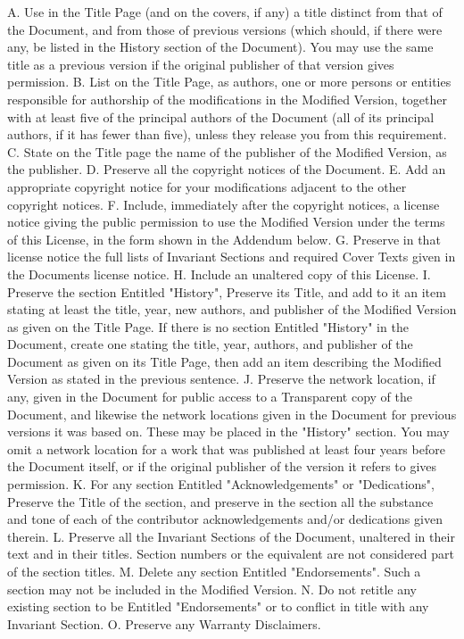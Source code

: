 \documentclass[
  english,
  11pt,
  a4paper,
]{article}
\begin{document}
A. Use in the Title Page (and on the covers, if any) a title distinct
from that of the Document, and from those of previous versions (which
should, if there were any, be listed in the History section of the
Document). You may use the same title as a previous version if the
original publisher of that version gives permission. B. List on the
Title Page, as authors, one or more persons or entities responsible for
authorship of the modifications in the Modified Version, together with
at least five of the principal authors of the Document (all of its
principal authors, if it has fewer than five), unless they release you
from this requirement. C. State on the Title page the name of the
publisher of the Modified Version, as the publisher. D. Preserve all the
copyright notices of the Document. E. Add an appropriate copyright
notice for your modifications adjacent to the other copyright notices.
F. Include, immediately after the copyright notices, a license notice
giving the public permission to use the Modified Version under the terms
of this License, in the form shown in the Addendum below. G. Preserve in
that license notice the full lists of Invariant Sections and required
Cover Texts given in the Document\textquotesingle s license notice. H.
Include an unaltered copy of this License. I. Preserve the section
Entitled "History", Preserve its Title, and add to it an item stating at
least the title, year, new authors, and publisher of the Modified
Version as given on the Title Page. If there is no section Entitled
"History" in the Document, create one stating the title, year, authors,
and publisher of the Document as given on its Title Page, then add an
item describing the Modified Version as stated in the previous sentence.
J. Preserve the network location, if any, given in the Document for
public access to a Transparent copy of the Document, and likewise the
network locations given in the Document for previous versions it was
based on. These may be placed in the "History" section. You may omit a
network location for a work that was published at least four years
before the Document itself, or if the original publisher of the version
it refers to gives permission. K. For any section Entitled
"Acknowledgements" or "Dedications", Preserve the Title of the section,
and preserve in the section all the substance and tone of each of the
contributor acknowledgements and/or dedications given therein. L.
Preserve all the Invariant Sections of the Document, unaltered in their
text and in their titles. Section numbers or the equivalent are not
considered part of the section titles. M. Delete any section Entitled
"Endorsements". Such a section may not be included in the Modified
Version. N. Do not retitle any existing section to be Entitled
"Endorsements" or to conflict in title with any Invariant Section. O.
Preserve any Warranty Disclaimers.
\end{document}
